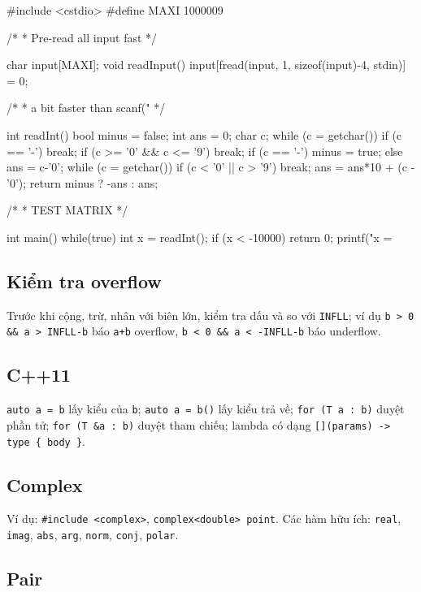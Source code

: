 \documentclass[11pt]{article}
\begin{document}
\begingroup\scriptsize
\begin{vncode}
#include <cstdio>
#define MAXI 1000009

/*
 * Pre-read all input fast
 */

char input[MAXI];
void readInput() {
	input[fread(input, 1, sizeof(input)-4, stdin)] = 0;
}

/*
 * a bit faster than scanf("%
 */

int readInt() {
	bool minus = false;
	int ans = 0;
	char c;
	while (c = getchar()) {
		if (c == '-') break;
		if (c >= '0' && c <= '9') break;
	}
	if (c == '-') minus = true;
	else ans = c-'0';
	while (c = getchar()) {
		if (c < '0' || c > '9') break;
		ans = ans*10 + (c - '0');
	}
	return minus ? -ans : ans;
}

/*
 * TEST MATRIX
 */

int main() {
	while(true) {
		int x = readInt();
		if (x < -10000) return 0;
		printf("x = %
	}
}
\end{vncode}
\endgroup


\subsection{Kiểm tra overflow}

Trước khi cộng, trừ, nhân với biên lớn, kiểm tra dấu và so với \texttt{INFLL}; ví dụ \texttt{b > 0 \&\& a > INFLL-b} báo \texttt{a+b} overflow, \texttt{b < 0 \&\& a < -INFLL-b} báo underflow.

\subsection{C++11}

\texttt{auto a = b} lấy kiểu của \texttt{b}; \texttt{auto a = b()} lấy kiểu trả về; \texttt{for (T a : b)} duyệt phần tử; \texttt{for (T \&a : b)} duyệt tham chiếu; lambda có dạng \texttt{[](params) -> type \{ body \}}.

\subsection{Complex}

Ví dụ: \texttt{\#include <complex>}, \texttt{complex<double> point}. Các hàm hữu ích: \texttt{real}, \texttt{imag}, \texttt{abs}, \texttt{arg}, \texttt{norm}, \texttt{conj}, \texttt{polar}.

\subsection{Pair}
\end{document}
